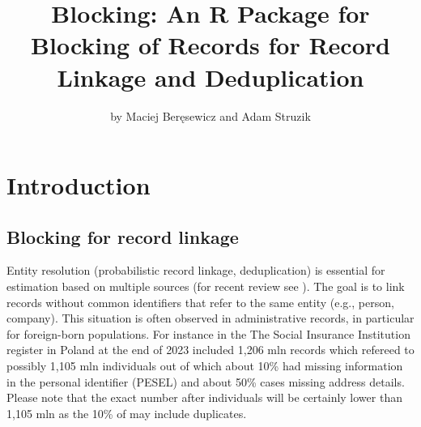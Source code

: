 \title{Blocking: An R Package for Blocking of Records for Record Linkage and Deduplication}


\author{by Maciej Beręsewicz and Adam Struzik}

\maketitle


\section{Introduction}\label{introduction}

\subsection{Blocking for record linkage}\label{blocking-for-record-linkage}

Entity resolution (probabilistic record linkage, deduplication) is essential for estimation based on multiple sources (for recent review see \citet{Binette2022}). The goal is to link records without common identifiers that refer to the same entity (e.g., person, company). This situation is often observed in administrative records, in particular for foreign-born populations. For instance in the The Social Insurance Institution register in Poland at the end of 2023 included 1,206 mln records which refereed to possibly 1,105 mln individuals out of which about 10\% had missing information in the personal identifier (PESEL) and about 50\% cases missing address details. Please note that the exact number after individuals will be certainly lower than 1,105 mln as the 10\% of may include duplicates.

